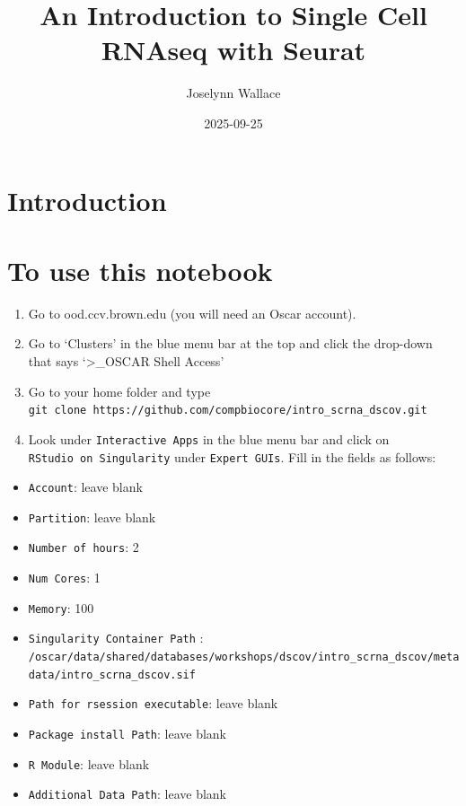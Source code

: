 \documentclass[
  letterpaper,
  DIV=11,
  numbers=noendperiod]{scrreprt}
\title{An Introduction to Single Cell RNAseq with Seurat}
\author{Joselynn Wallace}
\date{2025-09-25}
\providecommand{\tightlist}{%
  \setlength{\itemsep}{0pt}\setlength{\parskip}{0pt}}
\renewcommand*\contentsname{Table of contents}
\newcommand\contentsname{Table of contents}
\begin{document}
\maketitle

\renewcommand*\contentsname{Table of contents}
{
\hypersetup{linkcolor=}
\setcounter{tocdepth}{2}
\tableofcontents
}


\chapter{Introduction}\label{introduction}


\chapter{To use this notebook}\label{to-use-this-notebook}

\begin{enumerate}
\def\labelenumi{\arabic{enumi}.}
\tightlist
\item
  Go to ood.ccv.brown.edu (you will need an Oscar account).
\item
  Go to `Clusters' in the blue menu bar at the top and click the
  drop-down that says `\textgreater\_OSCAR Shell Access'
\item
  Go to your home folder and type
  \texttt{git\ clone\ https://github.com/compbiocore/intro\_scrna\_dscov.git}
\item
  Look under \texttt{Interactive\ Apps} in the blue menu bar and click
  on \texttt{RStudio\ on\ Singularity} under \texttt{Expert\ GUIs}. Fill
  in the fields as follows:
\end{enumerate}

\begin{itemize}
\tightlist
\item
  \texttt{Account}: leave blank\\
\item
  \texttt{Partition}: leave blank\\
\item
  \texttt{Number\ of\ hours}: 2\\
\item
  \texttt{Num\ Cores}: 1\\
\item
  \texttt{Memory}: 100\\
\item
  \texttt{Singularity\ Container\ Path} :
  \texttt{/oscar/data/shared/databases/workshops/dscov/intro\_scrna\_dscov/metadata/intro\_scrna\_dscov.sif}\\
\item
  \texttt{Path\ for\ rsession\ executable}: leave blank\\
\item
  \texttt{Package\ install\ Path}: leave blank\\
\item
  \texttt{R\ Module}: leave blank\\
\item
  \texttt{Additional\ Data\ Path}: leave blank\\
\end{itemize}
\end{document}
